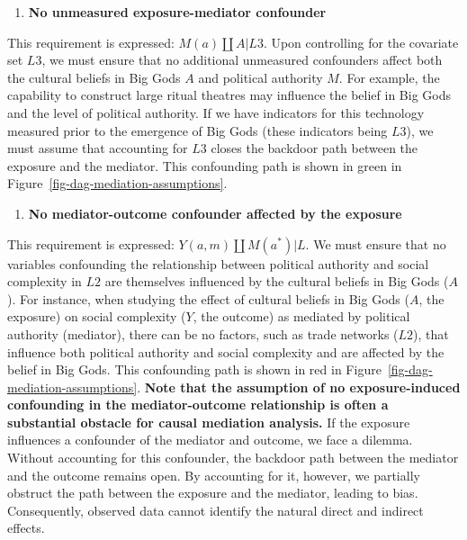 \documentclass[
  singlecolumn,
  9pt]{article}
\providecommand{\tightlist}{%
  \setlength{\itemsep}{0pt}\setlength{\parskip}{0pt}}\usepackage{longtable,booktabs,array}
\begin{document}
\begin{enumerate}
\def\labelenumi{\arabic{enumi}.}
\setcounter{enumi}{2}
\tightlist
\item
  \textbf{No unmeasured exposure-mediator confounder}
\end{enumerate}

This requirement is expressed: \(M(a) \coprod A | L3\). Upon controlling
for the covariate set \(L3\), we must ensure that no additional
unmeasured confounders affect both the cultural beliefs in Big Gods
\(A\) and political authority \(M\). For example, the capability to
construct large ritual theatres may influence the belief in Big Gods and
the level of political authority. If we have indicators for this
technology measured prior to the emergence of Big Gods (these indicators
being \(L3\)), we must assume that accounting for \(L3\) closes the
backdoor path between the exposure and the mediator. This confounding
path is shown in green in Figure~\ref{fig-dag-mediation-assumptions}.

\begin{enumerate}
\def\labelenumi{\arabic{enumi}.}
\setcounter{enumi}{3}
\tightlist
\item
  \textbf{No mediator-outcome confounder affected by the exposure}
\end{enumerate}

This requirement is expressed: \(Y(a,m) \coprod M(a^*) | L\). We must
ensure that no variables confounding the relationship between political
authority and social complexity in \(L2\) are themselves influenced by
the cultural beliefs in Big Gods (\(A\)). For instance, when studying
the effect of cultural beliefs in Big Gods (\(A\), the exposure) on
social complexity (\(Y\), the outcome) as mediated by political
authority (mediator), there can be no factors, such as trade networks
(\(L2\)), that influence both political authority and social complexity
and are affected by the belief in Big Gods. This confounding path is
shown in red in Figure~\ref{fig-dag-mediation-assumptions}. \textbf{Note
that the assumption of no exposure-induced confounding in the
mediator-outcome relationship is often a substantial obstacle for causal
mediation analysis.} If the exposure influences a confounder of the
mediator and outcome, we face a dilemma. Without accounting for this
confounder, the backdoor path between the mediator and the outcome
remains open. By accounting for it, however, we partially obstruct the
path between the exposure and the mediator, leading to bias.
Consequently, observed data cannot identify the natural direct and
indirect effects.
\end{document}
